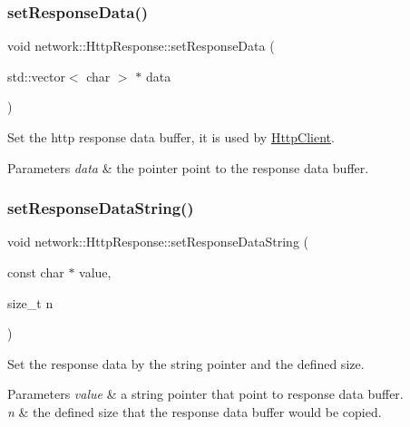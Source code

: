 \subsubsection{\texorpdfstring{set\+Response\+Data()}{setResponseData()}\hspace{0.1cm}{\footnotesize\ttfamily [2/2]}}
{\footnotesize\ttfamily void network\+::\+Http\+Response\+::set\+Response\+Data (\begin{DoxyParamCaption}\item[{std\+::vector$<$ char $>$ $\ast$}]{data }\end{DoxyParamCaption})\hspace{0.3cm}{\ttfamily [inline]}}

Set the http response data buffer, it is used by \hyperlink{classnetwork_1_1HttpClient}{Http\+Client}. 
\begin{DoxyParams}{Parameters}
{\em data} & the pointer point to the response data buffer. \\
\hline
\end{DoxyParams}
\mbox{\label{classnetwork_1_1HttpResponse_a9e2b4a15006d28a3d6128d3de3c615f7}} 
\subsubsection{\texorpdfstring{set\+Response\+Data\+String()}{setResponseDataString()}\hspace{0.1cm}{\footnotesize\ttfamily [1/2]}}
{\footnotesize\ttfamily void network\+::\+Http\+Response\+::set\+Response\+Data\+String (\begin{DoxyParamCaption}\item[{const char $\ast$}]{value,  }\item[{size\+\_\+t}]{n }\end{DoxyParamCaption})\hspace{0.3cm}{\ttfamily [inline]}}

Set the response data by the string pointer and the defined size. 
\begin{DoxyParams}{Parameters}
{\em value} & a string pointer that point to response data buffer. \\
\hline
{\em n} & the defined size that the response data buffer would be copied. \\
\hline
\end{DoxyParams}
\mbox{\label{classnetwork_1_1HttpResponse_a9e2b4a15006d28a3d6128d3de3c615f7}} 
